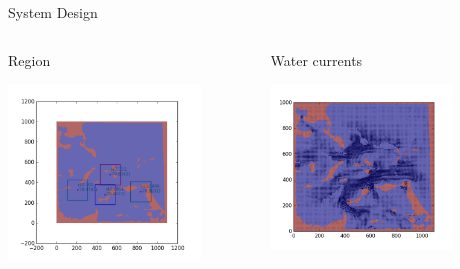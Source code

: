 \documentclass[9pt]{beamer}
\begin{document}
\begin{frame}{System Design}
    \begin{columns}
         \begin{column}{0.33\textwidth}
             \begin{block}{Region}   
                 \begin{center}
                     \includegraphics[width=0.8\textwidth,trim={3cm 3cm 3cm 3cm},clip]{img/Fig_targetsMap.png}
                 \end{center}
             \end{block} 
        \end{column}
        \begin{column}{0.33\textwidth}
             \begin{block}{Water currents}   
                 \begin{center}
                     \includegraphics[width=0.75\textwidth,trim={2cm 2cm 1.75cm 1cm},clip]{img/Fig_currentsMap-1.png}

\end{center}
\end{block}
\end{column}
\end{columns}
\end{frame}
\end{document}
